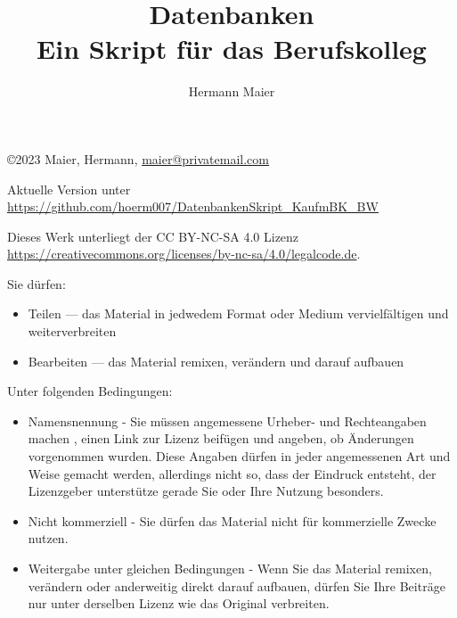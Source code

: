 \documentclass[a4paper,12pt, headsepline, ngerman]{scrartcl}
\theoremstyle{definition}
\begin{document}
	\setlength\parindent{0pt} %

	\rohead{}
	\cofoot[\pagemark]{\pagemark}
	\title{Datenbanken\\
	Ein Skript für das Berufskolleg}
	\author{Hermann Maier}
	\maketitle
	\thispagestyle{empty}
	\newpage
	\null\vfill
	\copyright 2023 Maier, Hermann, \href{mailto:maier@privatemail.com}{maier@privatemail.com}

    Aktuelle Version unter \href{https://github.com/hoerm007/DatenbankenSkript_KaufmBK_BW}{https://github.com/hoerm007/DatenbankenSkript\_KaufmBK\_BW}

	Dieses Werk unterliegt der CC BY-NC-SA 4.0 Lizenz \href{https://creativecommons.org/licenses/by-nc-sa/4.0/legalcode.de}{https://creativecommons.org/licenses/by-nc-sa/4.0/legalcode.de}.

	Sie dürfen:
	\begin{itemize}
		\item Teilen — das Material in jedwedem Format oder Medium vervielfältigen und weiterverbreiten
		\item Bearbeiten — das Material remixen, verändern und darauf aufbauen
	\end{itemize}
	Unter folgenden Bedingungen:
	\begin{itemize}
		\item Namensnennung - Sie müssen angemessene Urheber- und Rechteangaben machen , einen Link zur Lizenz beifügen und angeben, ob Änderungen vorgenommen wurden. Diese Angaben dürfen in jeder angemessenen Art und Weise gemacht werden, allerdings nicht so, dass der Eindruck entsteht, der Lizenzgeber unterstütze gerade Sie oder Ihre Nutzung besonders.
		\item Nicht kommerziell - Sie dürfen das Material nicht für kommerzielle Zwecke nutzen.
		\item Weitergabe unter gleichen Bedingungen - Wenn Sie das Material remixen, verändern oder anderweitig direkt darauf aufbauen, dürfen Sie Ihre Beiträge nur unter derselben Lizenz wie das Original verbreiten.
	\end{itemize}
	\newpage
	\tableofcontents
	\thispagestyle{empty}
	\newpage
	\def\pics{./pics}
	
	\newpage
	
	\newpage
	
	\newpage
	
	\newpage
	
	\newpage
	
	\newpage
	
	\newpage
	
	\newpage
	
	\newpage
	
	\newpage
	
	
	\newpage
	
	\newpage
	
	\newpage
\end{document}
